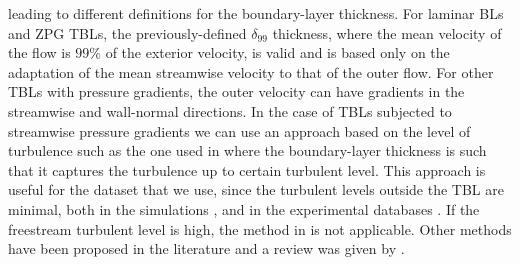 leading to different definitions for the boundary-layer thickness.
For laminar BLs and ZPG TBLs, the previously-defined $\delta_{99}$ thickness, where the mean velocity of the flow is $99\%$ of the exterior velocity, is valid and is based only on the adaptation of the mean streamwise velocity to that of the outer flow.
For other TBLs with pressure gradients, the outer velocity can have gradients in the streamwise and wall-normal directions. In the case of TBLs subjected to streamwise pressure gradients we can use an approach based on the level of turbulence such as the one used in \cite{diagnostic_Vinuesa} where the boundary-layer thickness is such that it captures the turbulence up to certain turbulent level.
This approach is useful for the dataset that we use, since the turbulent levels outside the TBL are minimal, both in the simulations \citep{EAmorZPG, bobke2017, Pozuelo_JFM_22}, and in the experimental databases \citep{Sanmiguel_PRF}.
If the freestream turbulent level is high, the method in \cite{diagnostic_Vinuesa} is not applicable. 
Other methods have been proposed in the literature and a review was given by \cite{d99_determination_2020}.

